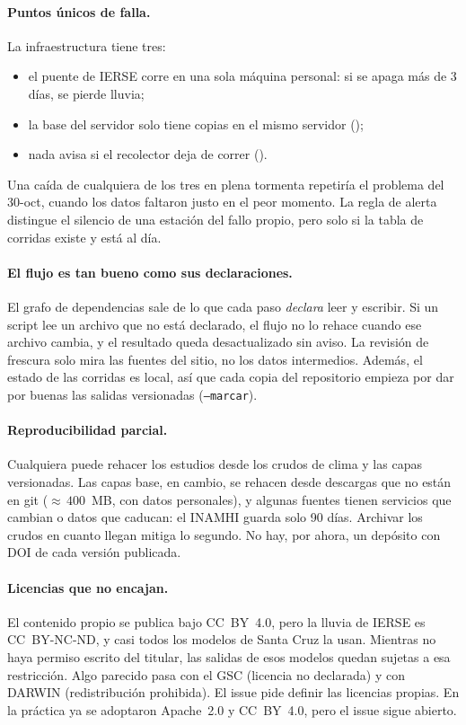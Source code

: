 \documentclass{sosg-informe}
\begin{document}
\paragraph{Puntos únicos de falla.} La infraestructura tiene tres:
\begin{itemize}
  \item el puente de IERSE corre en una sola máquina personal: si se apaga más de 3 días, se pierde lluvia;
  \item la base del servidor solo tiene copias en el mismo servidor ();
  \item nada avisa si el recolector deja de correr ().
\end{itemize}
Una caída de cualquiera de los tres en plena tormenta repetiría el problema del 30-oct, cuando los datos faltaron justo en el peor momento. La regla de alerta distingue el silencio de una estación del fallo propio, pero solo si la tabla de corridas existe y está al día.

\paragraph{El flujo es tan bueno como sus declaraciones.} El grafo de dependencias sale de lo que cada paso \emph{declara} leer y escribir. Si un script lee un archivo que no está declarado, el flujo no lo rehace cuando ese archivo cambia, y el resultado queda desactualizado sin aviso. La revisión de frescura solo mira las fuentes del sitio, no los datos intermedios. Además, el estado de las corridas es local, así que cada copia del repositorio empieza por dar por buenas las salidas versionadas (\texttt{--marcar}).

\paragraph{Reproducibilidad parcial.} Cualquiera puede rehacer los estudios desde los crudos de clima y las capas versionadas. Las capas base, en cambio, se rehacen desde descargas que no están en git (${\approx}\,400$~MB, con datos personales), y algunas fuentes tienen servicios que cambian o datos que caducan: el INAMHI guarda solo 90 días. Archivar los crudos en cuanto llegan mitiga lo segundo. No hay, por ahora, un depósito con DOI de cada versión publicada.

\paragraph{Licencias que no encajan.} El contenido propio se publica bajo CC~BY~4.0, pero la lluvia de IERSE es CC~BY-NC-ND, y casi todos los modelos de Santa Cruz la usan. Mientras no haya permiso escrito del titular, las salidas de esos modelos quedan sujetas a esa restricción. Algo parecido pasa con el GSC (licencia no declarada) y con DARWIN (redistribución prohibida). El issue  pide definir las licencias propias. En la práctica ya se adoptaron Apache~2.0 y CC~BY~4.0, pero el issue sigue abierto.
\end{document}
